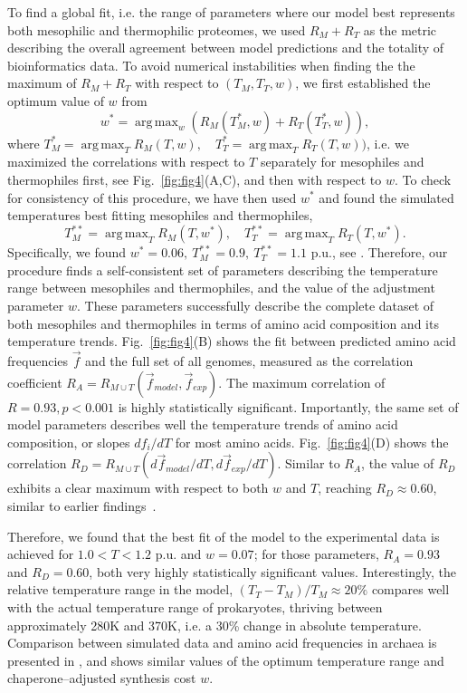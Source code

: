 \documentclass[10pt,letterpaper]{article}
\DeclareMathOperator*{\argmax}{arg\,max}
\begin{document}
To find a global fit, i.e. the range of parameters where our model best represents both mesophilic and thermophilic proteomes, we used $R_M + R_T$ as the metric describing the overall agreement between model predictions and the totality of bioinformatics data. To avoid numerical instabilities when finding the the maximum of $R_M+R_T$ with respect to $(T_M, T_T, w)$, we first established the optimum value of $w$ from
$$
w^* = \argmax_{w} (R_M(T_M^*, w) + R_T(T^*_T,w) ),
$$
where $T_M^*=\argmax_{T}R_M(T,w), \quad T_T^*=\argmax_{T}R_T(T,w))$, i.e. we maximized the correlations with respect to $T$ separately for mesophiles and thermophiles first, see Fig.~\ref{fig:fig4}(A,C), and then with respect to $w$. To check for consistency of this procedure, we have then used $w^*$ and found the simulated temperatures best fitting mesophiles and thermophiles, 
$$
T^{**}_M = \argmax_{T}R_M(T, w^*), \quad T^{**}_T = \argmax_{T}R_T(T, w^*).
$$
Specifically, we found $w^*=0.06,\  T^{**}_M=0.9,\ T^{**}_T=1.1$ p.u., see . Therefore, our procedure finds a self-consistent set of parameters describing the temperature range between mesophiles and thermophiles, and the value of the adjustment parameter $w$. These parameters successfully describe the complete dataset of both mesophiles and thermophiles in terms of amino acid composition and its temperature trends. Fig.~\ref{fig:fig4}(B) shows the fit between predicted amino acid frequencies $\vec f$ and the full set of all genomes, measured as the correlation coefficient $R_A = R_{M \cup T}(\vec f_{model}, \vec f_{exp})$. The maximum correlation of $R=0.93, p<0.001$ is highly statistically significant. Importantly, the same set of model parameters describes well the temperature trends of amino acid composition, or slopes $df_i/dT$ for most amino acids. Fig.~\ref{fig:fig4}(D) shows the correlation $R_D = R_{M\cup T}(d\vec f_{model}{/dT}, d\vec f_{exp}/dT)$. Similar to $R_A$, the value of $R_D$ exhibits a clear maximum with respect to both $w$ and $T$, reaching $R_D\approx0.60$, similar to earlier findings~\cite{Venev2015Massively}.

Therefore, we found that the best fit of the model to the experimental data is achieved for $1.0<T<1.2$ p.u. and $w=0.07$; for those parameters, $R_A=0.93$ and $R_D=0.60$, both very highly statistically significant values. Interestingly, the relative temperature range in the model, $(T_T-T_M)/T_M\approx 20\%$ compares well with the actual temperature range of prokaryotes, thriving between approximately 280K and 370K, i.e. a 30\% change in absolute temperature. Comparison between simulated data and amino acid frequencies in archaea is presented in , and shows similar values of the optimum temperature range and chaperone--adjusted synthesis cost $w$.
\end{document}
